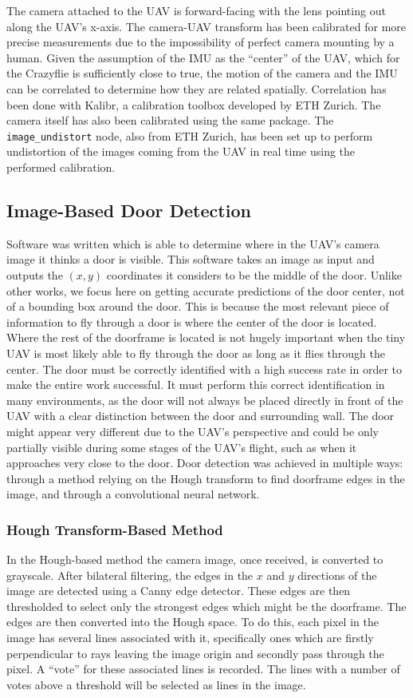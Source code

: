 \documentclass[12pt]{article}
\begin{document}
The camera attached to the UAV is forward-facing with the lens pointing out along the UAV's x-axis. The camera-UAV transform has been calibrated for more precise measurements due to the impossibility of perfect camera mounting by a human. Given the assumption of the IMU as the ``center'' of the UAV, which for the Crazyflie is sufficiently close to true, the motion of the camera and the IMU can be correlated to determine how they are related spatially. Correlation has been done with Kalibr\cite{Kalibr}, a calibration toolbox developed by ETH Zurich. The camera itself has also been calibrated using the same package. The \verb|image_undistort| \cite{image_undistort} node, also from ETH Zurich, has been set up to perform undistortion of the images coming from the UAV in real time using the performed calibration. 

\subsection{Image-Based Door Detection}
Software was written which is able to determine where in the UAV's camera image it thinks a door is visible. This software takes an image as input and outputs the $(x,y)$ coordinates it considers to be the middle of the door. Unlike other works, we focus here on getting accurate predictions of the door center, not of a bounding box around the door. This is because the most relevant piece of information to fly through a door is where the center of the door is located. Where the rest of the doorframe is located is not hugely important when the tiny UAV is most likely able to fly through the door as long as it flies through the center. The door must be correctly identified with a high success rate in order to make the entire work successful. It must perform this correct identification in many environments, as the door will not always be placed directly in front of the UAV with a clear distinction between the door and surrounding wall. The door might appear very different due to the UAV's perspective and could be only partially visible during some stages of the UAV's flight, such as when it approaches very close to the door. Door detection was achieved in multiple ways: through a method relying on the Hough transform to find doorframe edges in the image, and through a convolutional neural network.

\subsubsection{Hough Transform-Based Method}
In the Hough-based method the camera image, once received, is converted to grayscale. After bilateral filtering, the edges in the $x$ and $y$ directions of the image are detected using a Canny edge detector. These edges are then thresholded to select only the strongest edges which might be the doorframe. The edges are then converted into the Hough space. To do this, each pixel in the image has several lines associated with it, specifically ones which are firstly perpendicular to rays leaving the image origin and secondly pass through the pixel. A ``vote'' for these associated lines is recorded. The lines with a number of votes above a threshold will be selected as lines in the image. 
\end{document}
